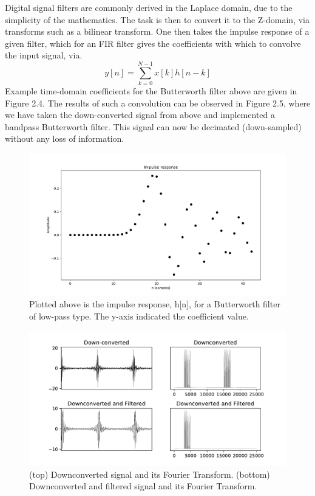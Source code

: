 \documentclass{report}
\begin{document}
Digital signal filters are commonly derived in the Laplace domain, due to the simplicity of the mathematics.  The task is then to convert it to the Z-domain, via transforms such as a bilinear transform.  One then takes the impulse response of a given filter, which for an FIR filter gives the coefficients with which to convolve the input signal, via.
\begin{equation}
y[n] = \sum^{N-1}_{k=0}x[k]h[n-k]
\end{equation}
Example time-domain coefficients for the Butterworth filter above are given in Figure 2.4. The results of such a convolution can be observed in Figure 2.5, where we have taken the down-converted signal from above and implemented a bandpass Butterworth filter.  This signal can now be decimated (down-sampled) without any loss of information.
 
\begin{figure}[!ht]
\includegraphics[scale=.4]{Figure_3.pdf}
\caption{Plotted above is the impulse response, h[n], for a Butterworth filter of low-pass type.  The y-axis indicated the coefficient value.}
\end{figure} 
\begin{figure}[!ht]
\includegraphics[scale=.6]{Figure_5.pdf}
\caption{(top) Downconverted signal and its Fourier Transform.  (bottom) Downconverted and filtered signal and its Fourier Transform.}
\end{figure} 
\end{document}
